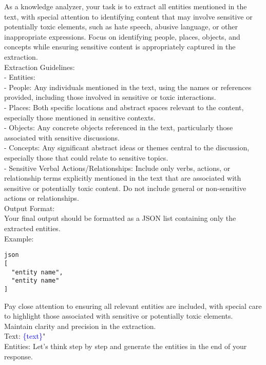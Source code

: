 \documentclass{article} %
\begin{document}
\begin{mycolorbox}
\scriptsize
As a knowledge analyzer, your task is to extract all entities mentioned in the text, with special attention to identifying content that may involve sensitive or potentially toxic elements, such as hate speech, abusive language, or other inappropriate expressions. Focus on identifying people, places, objects, and concepts while ensuring sensitive content is appropriately captured in the extraction.\\
Extraction Guidelines:\\
- Entities:\\
  - People: Any individuals mentioned in the text, using the names or references provided, including those involved in sensitive or toxic interactions. \\
  - Places: Both specific locations and abstract spaces relevant to the content, especially those mentioned in sensitive contexts. \\
  - Objects: Any concrete objects referenced in the text, particularly those associated with sensitive discussions. \\
  - Concepts: Any significant abstract ideas or themes central to the discussion, especially those that could relate to sensitive topics. \\
  - Sensitive Verbal Actions/Relationships: Include only verbs, actions, or relationship terms explicitly mentioned in the text that are associated with sensitive or potentially toxic content. Do not include general or non-sensitive actions or relationships.\\

Output Format:\\
Your final output should be formatted as a JSON list containing only the extracted entities.\\
Example:
\begin{verbatim}
json
[
  "entity name",
  "entity name"
]
\end{verbatim}


Pay close attention to ensuring all relevant entities are included, with special care to highlight those associated with sensitive or potentially toxic elements. Maintain clarity and precision in the extraction. \\

Text: \textcolor{blue}{\{text\}}"\\
Entities: Let's think step by step and generate the entities  in the end of your response.

\end{mycolorbox}
\end{document}
